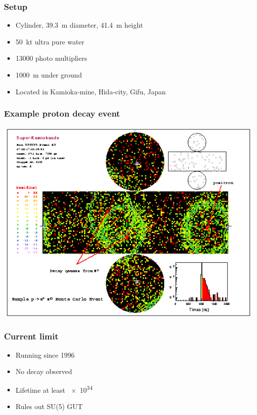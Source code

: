 \documentclass[english, fleqn]{beamer}
\begin{document}
\begin{frame}
    \frametitle{Setup}

    \begin{itemize}
        \item Cylinder, \SI{39.3}{\meter} diameter, \SI{41.4}{\meter} height
        \item \SI{50}{\kilo\tonne} ultra pure water
        \item \num{13000} photo multipliers
        \item \SI{1000}{\meter} under ground
        \item Located in Kamioka-mine, Hida-city, Gifu, Japan
    \end{itemize}

    \parencite{super-k/overview}
\end{frame}

\begin{frame}
    \frametitle{}

\end{frame}

\begin{frame}
    \frametitle{Example proton decay event}

    \centering
    \includegraphics[width=0.8\linewidth]{Figures/epi0_nice_event.png}
    \parencite{boston_university/proton_decay}
\end{frame}


\begin{frame}
    \frametitle{Current limit}

    \begin{itemize}
        \item Running since 1996
        \item No decay observed
            \pause
        \item Lifetime at least \SI{e34}{\year}
        \item Rules out SU(5) GUT
    \end{itemize}

    \parencite{super-k/proton_decay}
\end{frame}
\end{document}
